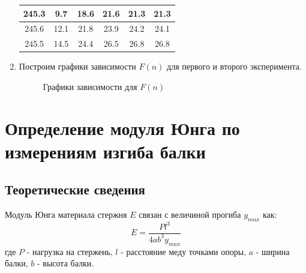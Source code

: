 \documentclass[12pt]{article}
\begin{document}
\begin{enumerate}
\begin{table}[H]
\begin{tabular}{|c|c|c|c|c|c|}
    245.3          & 9.7    & 18.6                 & 21.6              & 21.3                 & 21.3               \\ \hline
    245.6          & 12.1   & 21.8                 & 23.9              & 24.2                 & 24.1               \\ \hline
    245.5          & 14.5   & 24.4                 & 26.5              & 26.8                 & 26.8               \\ \hline
    \end{tabular}
    \end{table}
    \item Построим графики зависимости $F(n)$ для первого и второго эксперимента.
    \begin{figure}[H]
        \centering
        \caption{Графики зависимости для $F(n)$}
        
    \end{figure}
    \end{enumerate}

    \section{Определение модуля Юнга по измерениям изгиба балки}
    \subsection{Теоретические сведения}
    Модуль Юнга материала стержня $E$ связан с величиной
    прогиба $y_{max}$ как:
    \begin{equation}\label{balka}
        E=\frac{Pl^3}{4ab^3y_{max}}
    \end{equation}
    где $P$ - нагрузка на стержень, $l$ - расстояние меду точками опоры,
    $a$ - ширина балки, $b$ - высота балки.
\end{document}
